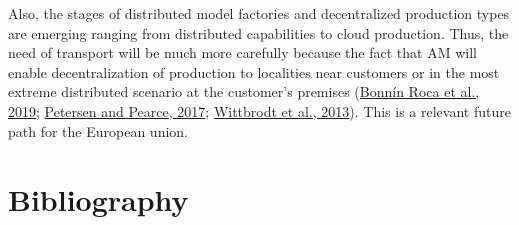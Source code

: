 \documentclass[
  11pt,
]{article}
\begin{document}
Also, the stages of distributed model factories and decentralized
production types are emerging ranging from distributed capabilities to
cloud production. Thus, the need of transport will be much more
carefully because the fact that AM will enable decentralization of
production to localities near customers or in the most extreme
distributed scenario at the customer's premises
(\protect\hyperlink{ref-BonninRoca2019}{Bonnín Roca et al., 2019};
\protect\hyperlink{ref-Petersen2017a}{Petersen and Pearce, 2017};
\protect\hyperlink{ref-Wittbrodt2013}{Wittbrodt et al., 2013}). This is
a relevant future path for the European union.

\newpage

\hypertarget{bibliography}{%
\section{Bibliography}\label{bibliography}}
\end{document}
